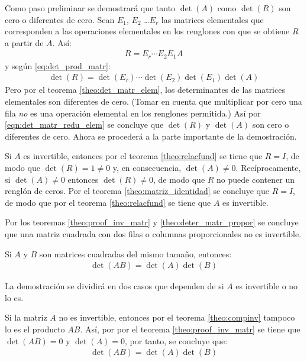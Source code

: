 \documentclass[a4paper,12pt]{article}
\begin{document}
Como paso preliminar se demostrará que tanto $\det(A)$ como $\det(R)$ son cero
o diferentes de cero. Sean $E_1$, $E_2$ \ldots $E_r$ las matrices elementales
que corresponden a las operaciones elementales en los renglones con que se
obtiene $R$ a partir de $A$. Así:
\begin{align*}
  R=E_r\cdots E_2E_1A
\end{align*}
y según \eqref{eq:det_prod_matr}:
\begin{align}
  \det(R)=\det(E_r)\cdots\det(E_2)\det(E_1)\det(A)
  \label{eqn:det_matr_redu_elem}
\end{align}
Pero por el teorema \ref{theo:det_matr_elem}, los determinantes de las
matrices elementales son diferentes de cero. (Tomar en cuenta que multiplicar
por cero una fila \emph{no} es una operación elemental en los renglones
permitida.) Así por \eqref{eqn:det_matr_redu_elem} se concluye que
$\det(R)$ y $\det(A)$ son cero o diferentes de cero. Ahora se procederá a la
parte importante de la demostración.

Si $A$ es invertible, entonces por el teorema \ref{theo:relacfund} se tiene
que $R=I$, de modo que $\det(R)=1\ne0$ y, en consecuencia, $\det(A)\ne0$.
Recíprocamente, si $\det(A)\ne0$ entonces $\det(R)\ne0$, de modo que $R$ no
puede contener un renglón de ceros. Por el teorema \ref{theo:matriz_identidad}
se concluye que $R=I$, de modo que por el teorema \ref{theo:relacfund} se
tiene que $A$ es invertible.

Por los teoremas \ref{theo:proof_inv_matr} y \ref{theo:deter_matr_propor} se
concluye que una matriz cuadrada con dos filas o columnas proporcionales no es
invertible.

\begin{theorem}
  Si $A$ y $B$ son matrices cuadradas del mismo tamaño, entonces:
  \begin{align*}
    \det(AB)=\det(A)\det(B)
  \end{align*}
  \label{theo:det_prod_matr}
\end{theorem}

\demo La demostración se dividirá en dos casos que dependen de si $A$ es
invertible o no lo es.

 Si la matriz $A$ no es invertible, entonces por el teorema
\ref{theo:compinv} tampoco lo es el producto $AB$. Así, por por el teorema
\ref{theo:proof_inv_matr} se tiene que $\det(AB)=0$ y $\det(A)=0$, por tanto,
se concluye que:
\begin{align*}
  \det(AB)=\det(A)\det(B)
\end{align*}
\end{document}
